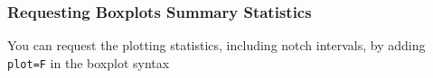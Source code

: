 \documentclass[10pt]{beamer}
\begin{document}
\begin{frame}
\label{notchedboxplot}
\begin{center}
\end{center}
\end{frame}


\begin{frame}
\frametitle{Requesting Boxplots Summary Statistics}

You can request the plotting
  statistics, including notch intervals, by adding
  {\color{red} \tt plot=F} in the boxplot syntax


\begin{center}
\end{center}
\end{frame}
\end{document}
